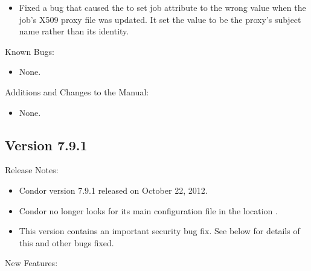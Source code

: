 \begin{itemize}

\item Fixed a bug that caused the  to set job attribute
 to the wrong value when the job's X509
proxy file was updated. It set the value to be the proxy's subject name
rather than its identity.

\end{itemize}

\noindent Known Bugs:

\begin{itemize}

\item None.

\end{itemize}

\noindent Additions and Changes to the Manual:

\begin{itemize}

\item None.

\end{itemize}


\subsection*{\label{sec:New-7-9-1}Version 7.9.1}

\noindent Release Notes:

\begin{itemize}

\item Condor version 7.9.1 released on October 22, 2012.

\item Condor no longer looks for its main configuration file in the
location .

\item \Security This version contains an important security bug fix.  See below
for details of this and other bugs fixed.

\end{itemize}


\noindent New Features:

